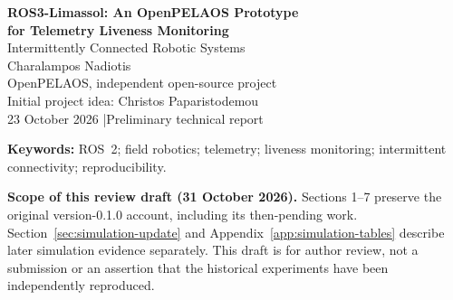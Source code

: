 \documentclass[11pt,a4paper]{article}
\begin{document}
\thispagestyle{plain}
\begin{center}
{\LARGE\bfseries ROS3-Limassol: An OpenPELAOS Prototype\\[3pt]
for Telemetry Liveness Monitoring}\\[8pt]
{\large Intermittently Connected Robotic Systems}\\[11pt]
Charalampos Nadiotis\\[3pt]
OpenPELAOS, independent open-source project\\[5pt]
{\small Initial project idea: Christos Paparistodemou}\\[5pt]
{\small 23 October 2026 \quad|\quad Preliminary technical report}
\end{center}

\begin{abstract}
Robotic telemetry can stop arriving because of communication disruption, publisher
failure, or upstream data interruption. A receiver therefore needs an explicit
rule for interpreting the absence of valid messages. This report describes
ROS3-Limassol, an OpenPELAOS development prototype comprising a transport-independent
Python core, a synthetic unmanned surface vehicle telemetry source, and an optional
ROS~2 adapter. The observer evaluates elapsed receiver time since the last accepted
message and distinguishes waiting, healthy, and stale states. Schema validation,
session identifiers, and increasing sequence numbers prevent several malformed
or replayed messages from refreshing that timer. A deterministic experiment
with a three-second blackout reproduces stale detection and recovery, accepting
51 of 81 generated samples. In the original version-0.1.0 validation, eighteen core tests pass; one ROS graph test is
explicitly skipped because ROS~2 is unavailable in the authoring environment.
The evidence establishes software behavior under a specified synthetic scenario.
Real transport timing, field performance, and research novelty remain unestablished.
An additional dated section summarizes subsequent synthetic and ArduPilot SITL
evidence; the reported SITL aggregates await an independent raw-recording audit
and make no physical-link or field claim.
\end{abstract}
{\small\textbf{Keywords:} ROS~2; field robotics; telemetry; liveness monitoring;
intermittent connectivity; reproducibility.}

\textbf{Scope of this review draft (31 October 2026).}
Sections 1--7 preserve the original version-0.1.0 account, including its
then-pending work. Section~\ref{sec:simulation-update} and
Appendix~\ref{app:simulation-tables} describe later simulation evidence
separately. This draft is for author review, not a submission or an assertion
that the historical experiments have been independently reproduced.
\end{document}
